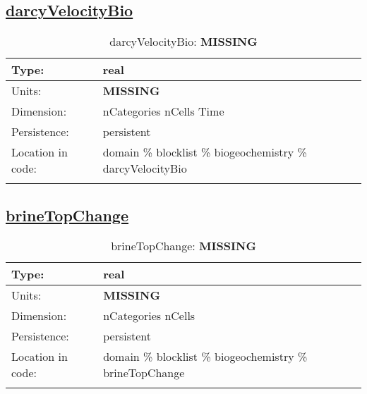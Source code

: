 \subsection[darcyVelocityBio]{\hyperref[sec:var_tab_biogeochemistry]{darcyVelocityBio}}
\label{subsec:var_sec_biogeochemistry_darcyVelocityBio}
\begin{center}
\begin{longtable}{| p{2.0in} | p{4.0in} |}
        \hline 
        Type: & real \\
        \hline 
        Units: & {\bf \color{red} MISSING} \\
        \hline 
        Dimension: & nCategories nCells Time \\
        \hline 
        Persistence: & persistent \\
        \hline 
         Location in code: & domain \% blocklist \% biogeochemistry \% darcyVelocityBio \\
         \hline 
    \caption{darcyVelocityBio: {\bf \color{red} MISSING}}
\end{longtable}
\end{center}
\subsection[brineTopChange]{\hyperref[sec:var_tab_biogeochemistry]{brineTopChange}}
\label{subsec:var_sec_biogeochemistry_brineTopChange}
\begin{center}
\begin{longtable}{| p{2.0in} | p{4.0in} |}
        \hline 
        Type: & real \\
        \hline 
        Units: & {\bf \color{red} MISSING} \\
        \hline 
        Dimension: & nCategories nCells \\
        \hline 
        Persistence: & persistent \\
        \hline 
         Location in code: & domain \% blocklist \% biogeochemistry \% brineTopChange \\
         \hline 
    \caption{brineTopChange: {\bf \color{red} MISSING}}
\end{longtable}
\end{center}
